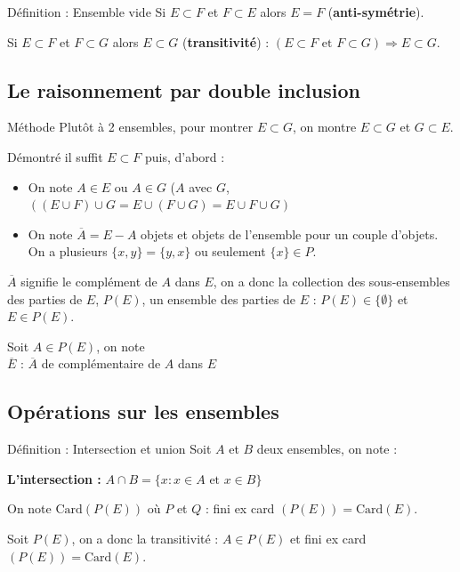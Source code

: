 \documentclass[a4paper,11pt]{article}
\begin{document}
\begin{defbox}{Définition : Ensemble vide}
Si $E \subset F$ et $F \subset E$ alors $E = F$ (\textbf{anti-symétrie}).

Si $E \subset F$ et $F \subset G$ alors $E \subset G$ (\textbf{transitivité}) : $(E \subset F \text{ et } F \subset G) \Rightarrow E \subset G$.
\end{defbox}

\subsection{Le raisonnement par double inclusion}

\begin{methodbox}{Méthode}
Plutôt à 2 ensembles, pour montrer $E \subset G$, on montre $E \subset G$ et $G \subset E$.

Démontré il suffit $E \subset F$ puis, d'abord :
\begin{itemize}
    \item On note $A \in E$ ou $A \in G$ ($A$ avec $G$, $((E \cup F) \cup G = E \cup (F \cup G) = E \cup F \cup G)$
    \item On note $\overline{A} = E - A$ objets et objets de l'ensemble pour un couple d'objets. On a plusieurs $\{x, y\} = \{y, x\}$ ou seulement $\{x\} \in P$.
\end{itemize}

$\overline{A}$ signifie le complément de $A$ dans $E$, on a donc la collection des sous-ensembles des parties de $E$, $P(E)$, un ensemble des parties de $E$ : $P(E) \in \{\emptyset\}$ et $E \in P(E)$.

Soit $A \in P(E)$, on note \\
$\overline{E}$ : $\overline{A}$ de complémentaire de $A$ dans $E$
\end{methodbox}

\subsection{Opérations sur les ensembles}

\begin{defbox}{Définition : Intersection et union}
Soit $A$ et $B$ deux ensembles, on note :

\textbf{L'intersection :} $A \cap B = \{x : x \in A \text{ et } x \in B\}$

On note $\text{Card}(P(E))$ où $P$ et $Q$ : fini ex card $(P(E)) = \text{Card}(E)$.

Soit $P(E)$, on a donc la transitivité : $A \in P(E)$ et fini ex card $(P(E)) = \text{Card}(E)$.
\end{defbox}
\end{document}
